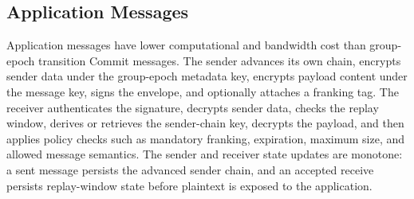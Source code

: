 \documentclass[preprint,12pt]{elsarticle}
\theoremstyle{definition}
\begin{document}
\subsection{Application Messages}

Application messages have lower computational and bandwidth cost than
group-epoch transition Commit messages. The sender advances its
own chain, encrypts sender data under the group-epoch metadata key, encrypts payload
content under the message key, signs the envelope, and optionally attaches a
franking tag. The receiver authenticates the signature, decrypts sender data,
checks the replay window, derives or retrieves the sender-chain key, decrypts
the payload, and then applies policy checks such as mandatory franking,
expiration, maximum size, and allowed message semantics.
The sender and receiver state updates are monotone: a sent message persists the
advanced sender chain, and an accepted receive persists replay-window state
before plaintext is exposed to the application.
\end{document}
